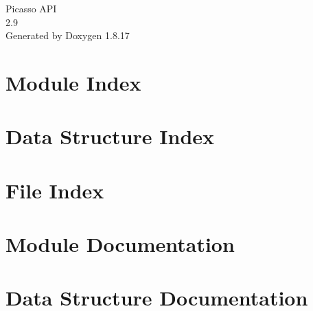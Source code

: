 \let\mypdfximage\pdfximage\def\pdfximage{\immediate\mypdfximage}\documentclass[twoside]{book}
\newcommand{\+}{\discretionary{\mbox{\scriptsize$\hookleftarrow$}}{}{}}
\newcommand{\clearemptydoublepage}{%
  \newpage{\pagestyle{empty}\cleardoublepage}%
}
\begin{document}
\begin{titlepage}
\vspace*{7cm}
\begin{center}%
{\Large Picasso A\+PI \\[1ex]\large 2.\+9 }\\
\vspace*{1cm}
{\large Generated by Doxygen 1.8.17}\\
\end{center}
\end{titlepage}
\clearemptydoublepage
{}
\tableofcontents
\clearemptydoublepage
{}

\chapter{Module Index}

\chapter{Data Structure Index}

\chapter{File Index}

\chapter{Module Documentation}



































\chapter{Data Structure Documentation}











\end{document}
